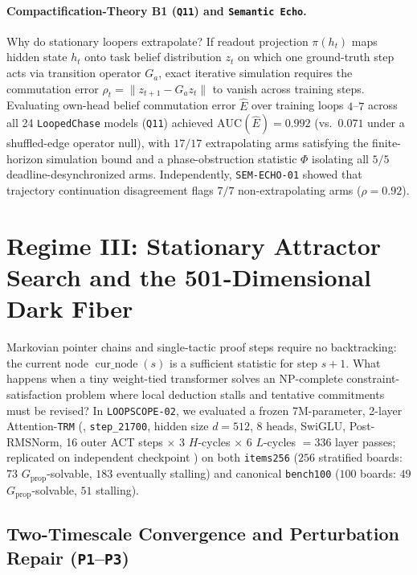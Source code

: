 \documentclass[10pt,letterpaper]{article}
\newcommand{\cur}{\operatorname{cur\_node}}
\newcommand{\Gprop}{G_{\mathrm{prop}}}
\begin{document}
\paragraph{Compactification-Theory B1 (\texttt{Q11}) and \texttt{Semantic Echo}.} Why do stationary loopers extrapolate? If readout projection $\pi(h_t)$ maps hidden state $h_t$ onto task belief distribution $z_t$ on which one ground-truth step acts via transition operator $G_a$, exact iterative simulation requires the commutation error $\rho_t = \|z_{t+1} - G_a z_t\|$ to vanish across training steps. Evaluating own-head belief commutation error $\hat{E}$ over training loops $4$--$7$ across all 24 \texttt{LoopedChase} models (\texttt{Q11}) achieved \textbf{$\mathrm{AUC}(\hat{E}) = 0.992$} (vs.\ $0.071$ under a shuffled-edge operator null), with $17/17$ extrapolating arms satisfying the finite-horizon simulation bound and a phase-obstruction statistic $\Phi$ isolating all $5/5$ deadline-desynchronized arms. Independently, \texttt{SEM-ECHO-01} showed that trajectory continuation disagreement flags $7/7$ non-extrapolating arms ($\rho = 0.92$).

\section{Regime III: Stationary Attractor Search and the 501-Dimensional Dark Fiber}\label{sec:regime3}

Markovian pointer chains and single-tactic proof steps require no backtracking: the current node $\cur(s)$ is a sufficient statistic for step $s+1$. What happens when a tiny weight-tied transformer solves an NP-complete constraint-satisfaction problem where local deduction stalls and tentative commitments must be revised? In \texttt{LOOPSCOPE-02}, we evaluated a frozen 7M-parameter, 2-layer Attention-\texttt{TRM} (, \texttt{step\_21700}, hidden size $d=512$, 8 heads, SwiGLU, Post-RMSNorm, 16 outer ACT steps $\times$ 3 $H$-cycles $\times$ 6 $L$-cycles $= 336$ layer passes; replicated on independent checkpoint ) on both \texttt{items256} ($256$ stratified boards: $73$ $\Gprop$-solvable, $183$ eventually stalling) and canonical \texttt{bench100} ($100$ boards: $49$ $\Gprop$-solvable, $51$ stalling).

\subsection{Two-Timescale Convergence and Perturbation Repair (\texttt{P1}--\texttt{P3})}
\end{document}
